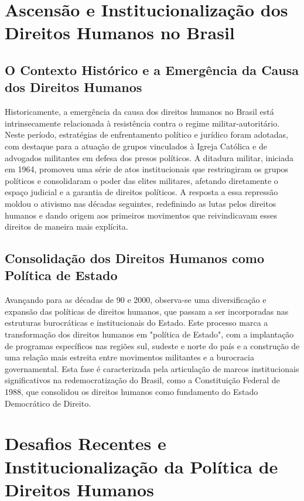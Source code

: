 \documentclass[
   article,       
   12pt,          
   oneside,       
   a4paper,       
   english,       
   brazil,        
   sumario=tradicional
   ]{abntex2}
\begin{document}
\section{Ascensão e Institucionalização dos Direitos Humanos no Brasil}

\subsection{O Contexto Histórico e a Emergência da Causa dos Direitos Humanos}

Historicamente, a emergência da causa dos direitos humanos no Brasil está intrinsecamente relacionada à resistência contra o regime militar-autoritário. Neste período, estratégias de enfrentamento político e jurídico foram adotadas, com destaque para a atuação de grupos vinculados à Igreja Católica e de advogados militantes em defesa dos presos políticos. A ditadura militar, iniciada em 1964, promoveu uma série de atos institucionais que restringiram os grupos políticos e consolidaram o poder das elites militares, afetando diretamente o espaço judicial e a garantia de direitos políticos. A resposta a essa repressão moldou o ativismo nas décadas seguintes, redefinindo as lutas pelos direitos humanos e dando origem aos primeiros movimentos que reivindicavam esses direitos de maneira mais explícita.

\subsection{Consolidação dos Direitos Humanos como Política de Estado}

Avançando para as décadas de 90 e 2000, observa-se uma diversificação e expansão das políticas de direitos humanos, que passam a ser incorporadas nas estruturas burocráticas e institucionais do Estado. Este processo marca a transformação dos direitos humanos em "política de Estado", com a implantação de programas específicos nas regiões sul, sudeste e norte do país e a construção de uma relação mais estreita entre movimentos militantes e a burocracia governamental. Esta fase é caracterizada pela articulação de marcos institucionais significativos na redemocratização do Brasil, como a Constituição Federal de 1988, que consolidou os direitos humanos como fundamento do Estado Democrático de Direito.

\section{Desafios Recentes e Institucionalização da Política de Direitos Humanos}
\end{document}
